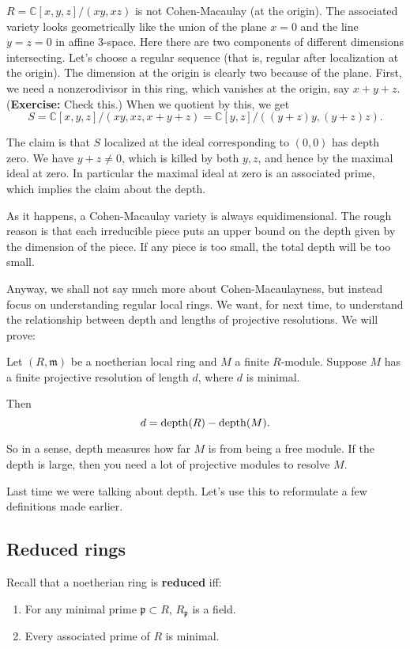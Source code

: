 \begin{example}
$R=\mathbb{C}[x,y,z]/(xy, xz)$ is not Cohen-Macaulay (at the
origin). The associated variety looks
geometrically like the union of the plane $x=0$ and the line
$y=z=0$ in affine
3-space. Here there are two components of different dimensions
intersecting.
Let's choose a regular sequence (that is, regular after
localization at the
origin). The dimension at the origin is clearly two because of
the plane.
First, we need a nonzerodivisor in this ring, which vanishes at
the origin, say
$ x+y+z$. (\textbf{Exercise:} Check this.) When we quotient by
this, we get
\[ S=\mathbb{C}[x,y,z]/(xy,xz, x+y+z) = \mathbb{C}[y,z]/(
(y+z)y, (y+z)z). \]

The claim is that $S$ localized at the ideal corresponding to
$(0,0)$ has depth
zero. We have $y+z \neq 0$, which is killed by both $y,z$, and
hence by the
maximal ideal at zero. In particular the maximal ideal at zero
is an associated
prime, which implies the claim about the depth.
\end{example}

As it happens, a Cohen-Macaulay variety is always
equidimensional. The rough
reason is that each irreducible piece puts an upper bound on the
depth given by
the dimension of the piece. If any piece is too small, the total
depth will be
too small.

Anyway, we shall not say much more about Cohen-Macaulayness, but
instead focus
on understanding regular local rings. We want, for next time,
to understand the relationship
between depth and lengths of projective resolutions.
We will prove:

\begin{theorem} Let $(R,
\mathfrak{m})$ be a
noetherian local ring and $M$ a finite $R$-module. Suppose $M$
has a finite
projective resolution of length $d$, where $d$ is minimal.

Then
\[ d = \operatorname{depth}(R) - \operatorname{depth}(M).  \]
\end{theorem}
So in a sense, depth measures how far $M$ is from being a free
module. If the
depth is large, then you need a lot of projective modules to
resolve $M$.

Last time we were talking about depth. Let's use this to
reformulate a few
definitions made earlier.

\subsection{Reduced rings}
Recall that a noetherian ring is \textbf{reduced} iff:
\begin{enumerate}
\item For any minimal prime $\mathfrak{p} \subset R$,
$R_{\mathfrak{p}}$ is a
field.
\item Every associated prime of $R$ is minimal.
\end{enumerate}

